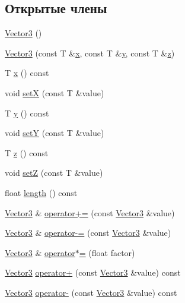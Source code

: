 \subsection*{Открытые члены}
\begin{DoxyCompactItemize}
\item 
\hyperlink{class_vector3_a54f99f4211298d5245ea578bdd5143cc}{Vector3} ()
\item 
\hyperlink{class_vector3_a84c61226b4e2b49a0935a01b84649e6e}{Vector3} (const T \&\hyperlink{class_vector3_a55614d2843061b025cb95891339cca0c}{x}, const T \&\hyperlink{class_vector3_a6dc34e4c9e1491c6bac8dee7350ebbc6}{y}, const T \&\hyperlink{class_vector3_a5bc9e3f59440d2f892ac9b1113a0f0cb}{z})
\item 
T \hyperlink{class_vector3_a55614d2843061b025cb95891339cca0c}{x} () const 
\item 
void \hyperlink{class_vector3_a342d8918baf44d59b231fad8fed36850}{setX} (const T \&value)
\item 
T \hyperlink{class_vector3_a6dc34e4c9e1491c6bac8dee7350ebbc6}{y} () const 
\item 
void \hyperlink{class_vector3_a24bf17b5d27fd72ca8c9581800365a5c}{setY} (const T \&value)
\item 
T \hyperlink{class_vector3_a5bc9e3f59440d2f892ac9b1113a0f0cb}{z} () const 
\item 
void \hyperlink{class_vector3_ae89a4fa1027e5f7c71cfe8b7ec25a0e2}{setZ} (const T \&value)
\item 
float \hyperlink{class_vector3_aeae8eae4d5a0a909aa0129c53c493038}{length} () const 
\item 
\hyperlink{class_vector3}{Vector3} \& \hyperlink{class_vector3_a757cacf1c357bb86043b62242b2ea4fd}{operator+=} (const \hyperlink{class_vector3}{Vector3} \&value)
\item 
\hyperlink{class_vector3}{Vector3} \& \hyperlink{class_vector3_a8c893c8194fb6cec3836e1878a18256b}{operator-\/=} (const \hyperlink{class_vector3}{Vector3} \&value)
\item 
\hyperlink{class_vector3}{Vector3} \& \hyperlink{class_vector3_a29d1e4a0f04b39f1eb33fdd4c17840ce}{operator$\ast$=} (float factor)
\item 
\hyperlink{class_vector3}{Vector3} \hyperlink{class_vector3_a83d8773b281400b251a46312f288b6c2}{operator+} (const \hyperlink{class_vector3}{Vector3} \&value) const 
\item 
\hyperlink{class_vector3}{Vector3} \hyperlink{class_vector3_aa2759ad6082cb6fcee8514742686b600}{operator-\/} (const \hyperlink{class_vector3}{Vector3} \&value) const 

\end{DoxyCompactItemize}
